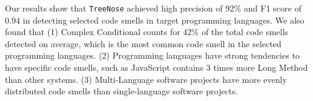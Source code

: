 Our results show that \texttt{TreeNose} achieved high precision of 92\% and F1 score of 0.94 in detecting selected code smells in target programming languages.
We also found that (1) Complex Conditional counts for 42\% of the total code smells detected on average, which is the most common code smell in the selected programming languages.
(2) Programming languages have strong tendencies to have specific code smells, such as JavaScript contains 3 times more Long Method than other systems.
(3) Multi-Language software projects have more evenly distributed code smells than single-language software projects.